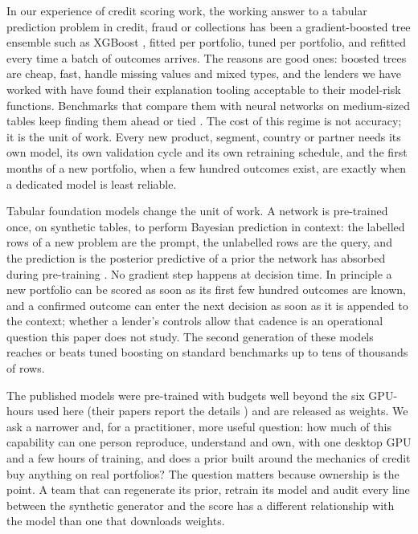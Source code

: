 \documentclass[twocolumn,10pt]{article}
\begin{document}
In our experience of credit scoring work, the working answer to a tabular prediction problem in credit, fraud or
collections has been a gradient-boosted tree ensemble such as XGBoost \citep{chen2016xgboost}, fitted per portfolio,
tuned per portfolio, and refitted every time a batch of outcomes arrives. The reasons are good ones: boosted trees are
cheap, fast, handle missing values and mixed types, and the lenders we have worked with have found their explanation
tooling acceptable to their model-risk functions. Benchmarks that compare them with neural networks on medium-sized
tables keep finding them ahead or tied \citep{grinsztajn2022why,mcelfresh2023when}. The cost
of this regime is not accuracy; it is the unit of work. Every new product, segment, country or partner needs its own
model, its own validation cycle and its own retraining schedule, and the first months of a new portfolio, when a few
hundred outcomes exist, are exactly when a dedicated model is least reliable.

Tabular foundation models change the unit of work. A network is pre-trained once, on synthetic tables, to perform
Bayesian prediction in context: the labelled rows of a new problem are the prompt, the unlabelled rows are the query,
and the prediction is the posterior predictive of a prior the network has absorbed during pre-training
\citep{muller2022transformers,hollmann2023tabpfn}. No gradient step happens at decision time. In principle a new
portfolio can be scored as soon as its first few hundred outcomes are known, and a confirmed outcome can enter the next
decision as soon as it is appended to the context; whether a lender's controls allow that cadence is an operational
question this paper does not study. The second generation of these models \citep{hollmann2025accurate,qu2025tabicl}
reaches or beats tuned boosting on standard benchmarks up to tens of thousands of rows.

The published models were pre-trained with budgets well beyond the six GPU-hours used here (their papers report the
details \citep{hollmann2025accurate,qu2025tabicl}) and are released as weights. We ask a narrower and, for a
practitioner, more useful question: how much of this capability can one person reproduce, understand and own, with one
desktop GPU and a few hours of training, and does a prior built around the mechanics of credit buy anything on real
portfolios? The question matters because ownership is the point. A team that can regenerate its prior, retrain its
model and audit every line between the synthetic generator and the score has a different relationship with the model
than one that downloads weights.
\end{document}
